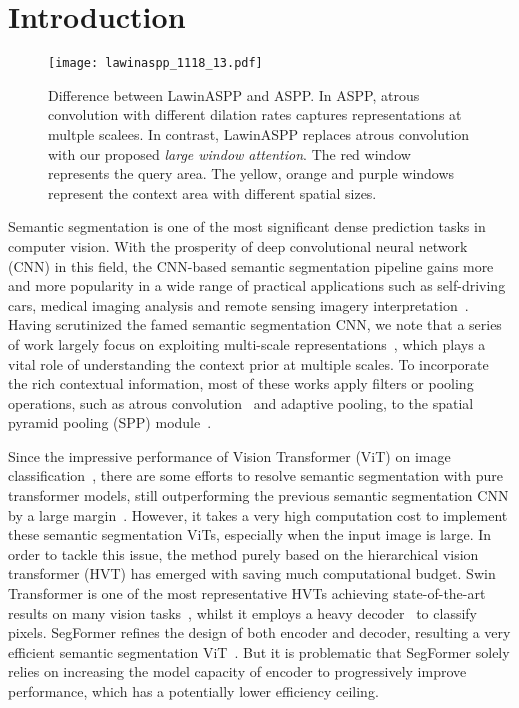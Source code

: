 \documentclass[10pt,twocolumn,letterpaper]{article}
\begin{document}
\section{Introduction}
\label{sec:intro}


\begin{figure}[t]
\begin{center}
\texttt{[image: lawinaspp\_1118\_13.pdf]} \vspace{-0.8cm}
\end{center}
  \caption{Difference between LawinASPP and ASPP. In ASPP, atrous convolution with different dilation rates captures representations at multple scalees. In contrast, LawinASPP replaces atrous convolution with our proposed \textit{large window attention}. The red window represents the query area. The yellow, orange and purple windows represent the context area with different spatial sizes.} 
\label{fig:LawinASPP}
\end{figure}

Semantic segmentation is one of the most significant dense prediction tasks in computer vision. With the prosperity of deep convolutional neural network (CNN) in this field, the CNN-based semantic segmentation pipeline gains more and more popularity in a wide range of practical applications such as self-driving cars, medical imaging analysis and remote sensing imagery interpretation~\cite{ronneberger2015u, mnih2010learning, siam2017deep}. Having scrutinized the famed semantic segmentation CNN, we note that a series of work largely focus on exploiting multi-scale representations~\cite{he2019adaptive, he2019dynamic, chen2017rethinking, zhao2017pyramid, chen2018encoder, yuan2018ocnet}, which plays a vital role of understanding the context prior at multiple scales. To incorporate the rich contextual information, most of these works apply filters or pooling operations, such as atrous convolution~\cite{yu2015multi} and adaptive pooling, to the spatial pyramid pooling (SPP) module~\cite{grauman2005pyramid, lazebnik2006beyond}.

Since the impressive performance of Vision Transformer (ViT) on image classification~\cite{touvron2021training, DBLP:conf/iclr/DosovitskiyB0WZ21}, there are some efforts to resolve semantic segmentation with pure transformer models, still outperforming the previous semantic segmentation CNN by a large margin~\cite{liu2021swin, strudel2021segmenter, zheng2021rethinking, xiao2018unified}. However, it takes a very high computation cost to implement these semantic segmentation ViTs, especially when the input image is large. In order to tackle this issue, the method purely based on the hierarchical vision transformer (HVT) has emerged with saving much computational budget. Swin Transformer is one of the most representative HVTs achieving state-of-the-art results on many vision tasks~\cite{liu2021swin}, whilst it employs a heavy decoder~\cite{xiao2018unified} to classify pixels. SegFormer refines the design of both encoder and decoder, resulting a very efficient semantic segmentation ViT~\cite{xie2021segformer}. But it is problematic that SegFormer solely relies on increasing the model capacity of encoder to progressively improve performance, which has a potentially lower efficiency ceiling. 
\end{document}
